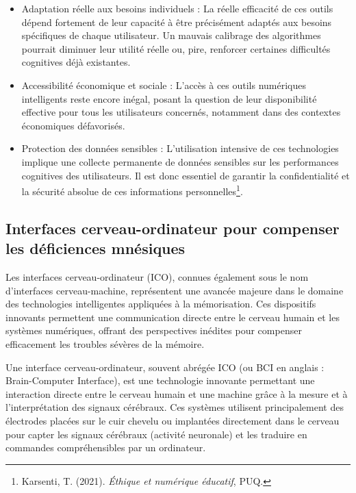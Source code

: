 \documentclass[12pt,a4paper]{report}
\begin{document}
\begin{itemize}

    \item Adaptation réelle aux besoins individuels :
La réelle efficacité de ces outils dépend fortement de leur capacité à être précisément adaptés aux besoins spécifiques de chaque utilisateur. Un mauvais calibrage des algorithmes pourrait diminuer leur utilité réelle ou, pire, renforcer certaines difficultés cognitives déjà existantes.

    \item Accessibilité économique et sociale :
L’accès à ces outils numériques intelligents reste encore inégal, posant la question de leur disponibilité effective pour tous les utilisateurs concernés, notamment dans des contextes économiques défavorisés.

    \item Protection des données sensibles :
L’utilisation intensive de ces technologies implique une collecte permanente de données sensibles sur les performances cognitives des utilisateurs. Il est donc essentiel de garantir la confidentialité et la sécurité absolue de ces informations personnelles\footnote{Karsenti, T. (2021). \textit{Éthique et numérique éducatif}, PUQ.}.

\end{itemize}

\subsection{Interfaces cerveau-ordinateur pour compenser les déficiences mnésiques}

Les interfaces cerveau-ordinateur (ICO), connues également sous le nom d’interfaces cerveau-machine, représentent une avancée majeure dans le domaine des technologies intelligentes appliquées à la mémorisation. Ces dispositifs innovants permettent une communication directe entre le cerveau humain et les systèmes numériques, offrant des perspectives inédites pour compenser efficacement les troubles sévères de la mémoire.

Une interface cerveau-ordinateur, souvent abrégée ICO (ou BCI en anglais : Brain-Computer Interface), est une technologie innovante permettant une interaction directe entre le cerveau humain et une machine grâce à la mesure et à l’interprétation des signaux cérébraux. Ces systèmes utilisent principalement des électrodes placées sur le cuir chevelu ou implantées directement dans le cerveau pour capter les signaux cérébraux (activité neuronale) et les traduire en commandes compréhensibles par un ordinateur.
\end{document}
